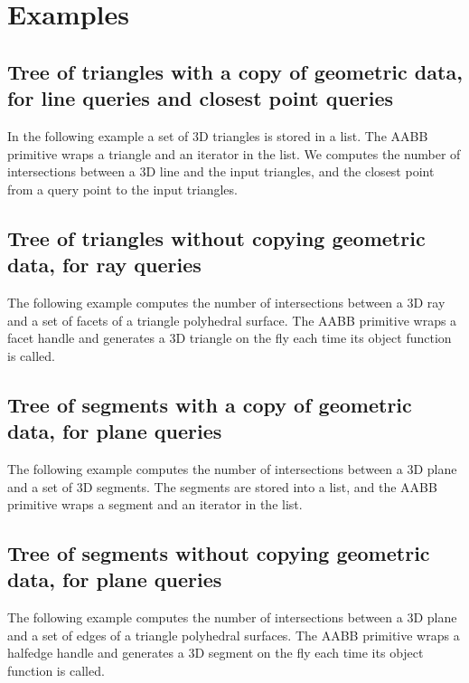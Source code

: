 \section{Examples}
\label{AABB_tree_section_examples}

\subsection{Tree of triangles with a copy of geometric data, for line queries and closest point queries}
In the following example a set of 3D triangles is stored in a list. The AABB primitive wraps a triangle and an iterator in the list. We computes the number of intersections between a 3D line and the input triangles, and the closest point from a query point to the input triangles.

\subsection{Tree of triangles without copying geometric data, for ray queries}
The following example computes the number of intersections between a 3D ray and a set of facets of a triangle polyhedral surface. The AABB primitive wraps a facet handle and generates a 3D triangle on the fly each time its object function is called.

\subsection{Tree of segments with a copy of geometric data, for plane queries}
The following example computes the number of intersections between a 3D plane and a set of 3D segments. The segments are stored into a list, and the AABB primitive wraps a segment and an iterator in the list.

\subsection{Tree of segments without copying geometric data, for plane queries}
The following example computes the number of intersections between a 3D plane and a set of edges of a triangle polyhedral surfaces. The AABB primitive wraps a halfedge handle and generates a 3D segment on the fly each time its object function is called.
